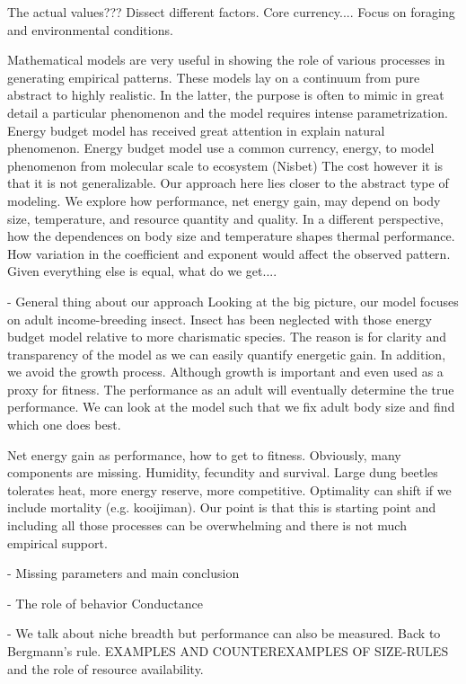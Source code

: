 The actual values???
Dissect different factors.
Core currency....
Focus on foraging and environmental conditions.


Mathematical models are very useful in showing the role of various processes in generating empirical patterns.
These models lay on a continuum from pure abstract to highly realistic.
In the latter, the purpose is often to mimic in great detail a particular phenomenon and the model requires intense parametrization.
Energy budget model has received great attention in explain natural phenomenon.
Energy budget model use a common currency, energy, to model phenomenon from molecular scale to ecosystem (Nisbet)
The cost however it is that it is not generalizable.
Our approach here lies closer to the abstract type of modeling.
We explore how performance, net energy gain, may depend on body size, temperature, and resource quantity and quality. 
In a different perspective, how the dependences on body size and temperature shapes thermal performance.
How variation in the coefficient and exponent would affect the observed pattern.
Given everything else is equal, what do we get....

- General thing about our approach
Looking at the big picture, our model focuses on adult income-breeding insect.
Insect has been neglected with those energy budget model relative to more charismatic species.
The reason is for clarity and transparency of the model as we can easily quantify energetic gain.
In addition, we avoid the growth process.
Although growth is important and even used as a proxy for fitness.
The performance as an adult will eventually determine the true performance.
We can look at the model such that we fix adult body size and find which one does best. 

Net energy gain as performance, how to get to fitness.
Obviously, many components are missing.
Humidity, fecundity and survival.
Large dung beetles tolerates heat, more energy reserve, more competitive.
Optimality can shift if we include mortality (e.g. kooijiman).
Our point is that this is starting point and including all those processes can be overwhelming and there is not much empirical support.


- Missing parameters and main conclusion

 - The role of behavior
 Conductance
 
 - We talk about niche breadth but performance can also be measured.
 Back to Bergmann's rule.
  EXAMPLES AND COUNTEREXAMPLES OF SIZE-RULES 
 and the role of resource availability.
 
